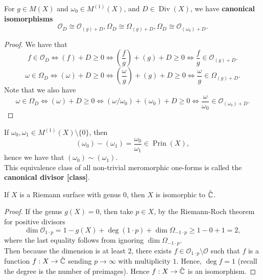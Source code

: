 \documentclass{article}
\begin{document}
{\begin{lemma}
For $g \in M(X)$ and $\omega_0 \in M^{(1)}(X)$, and $D \in \operatorname{Div}(X)$, we have \textbf{canonical isomorphisms}
\[\mathcal{O}_D \cong \mathcal{O}_{(g)+D}, \Omega_D \cong \Omega_{(g)+D}, \Omega_D \cong \mathcal{O}_{(\omega_0) + D}.\]
\end{lemma}

\begin{proof}
    We have that
    \[f \in \mathcal{O}_D \iff (f) + D \geq 0 \iff (\frac{f}{g}) + (g) + D \geq 0 \iff \frac{f}{g} \in \mathcal{O}_{(g) + D}.\]
    \[\omega \in \Omega_D \iff (\omega) + D \geq 0 \iff (\frac{\omega}{g}) + (g) + D \geq 0 \iff \frac{\omega}{g} \in \Omega_{(g)+D}.\]
    Note that we also have 
    \[\omega \in \Omega_D \iff (\omega) + D \geq 0 \iff (\omega/\omega_0) + (\omega_0) + D \geq 0 \iff \frac{\omega}{\omega_0} \in \mathcal{O}_{(\omega_0) + D}.\]
\end{proof}

\begin{lemma}
    If $\omega_0, \omega_1 \in M^{(1)}(X) \setminus \{0\}$, then
    \[(\omega_0) - (\omega_1) = \frac{\omega_0}{\omega_1} \in \operatorname{Prin}(X),\]
    hence we have that $(\omega_0) \sim (\omega_1)$.\\
    
    This equivalence class of all non-trivial meromorphic one-forms is called the \textbf{canonical divisor [class]}.
\end{lemma}

\begin{proposition}
    If $X$ is a Riemann surface with genus $0$, then $X$ is isomorphic to $\hat{\mathbb{C}}$.
\end{proposition}

\begin{proof}
    If the genus $g(X) = 0$, then take $p \in X$, by the Riemann-Roch theorem for positive divisors
    \[\dim \mathcal{O}_{1 \cdot p} = 1 - g(X) + \deg(1 \cdot p) + \dim \Omega_{-1 \cdot p} \geq 1 - 0 + 1 = 2,\]
    where the last equality follows from ignoring $ \dim \Omega_{-1 \cdot p}$.\\
    
    Then because the dimension is at least $2$, there exists $f \in \mathcal{O}_{1 \cdot p} \setminus \mathcal{O}$ such that $f$ is a function $f: X \to \hat{\mathbb{C}}$ sending $p \to \infty$ with multiplicity $1$. Hence, $\deg f = 1$ (recall the degree is the number of preimages). Hence $f: X \to \hat{\mathbb{C}}$ is an isomorphism.
\end{proof}


}
\end{document}
